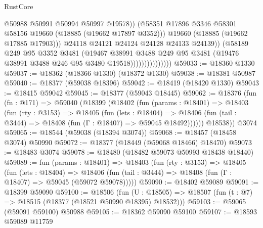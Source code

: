 \begin{lexlean}{RustCore}
\begin{coremodule}
                                      @50988
                                      @50991
                                      @50994
                                      @50997
                                      @19578))
                                  (@58351
                                    @17896
                                    @3346
                                    @58301
                                    @58156
                                    @19660
                                    (@18885 (@19662 @17897 @3352)))
                                  @19660
                                  (@18885 (@19662 @17885 @17903)))
                                @24118
                                @24121
                                @24124
                                @24128
                                @24133
                                @24139))
                            (@58189
                              @249
                              @95
                              @3352
                              @3481
                              (@19467
                                @38991
                                @3488
                                @249
                                @95
                                @3481
                                (@19476 @38991 @3488 @246 @95 @3480 @19518)))))))))))))))
@59033 := @18360 @1330
@59037 := @18362 (@18366 @1330) (@18372 @1330)
@59038 := @18381 @50987
@59040 := @18377 (@59038 @18396)
@59042 := @18419 (@18420 @1330)
@59043 := @18415 @59042
@59045 := @18377 (@59043 @18445)
@59062 := @18376
    (fun (fn : @171) =>
    @59040
      (@18399
        (@18402
          (fun (params : @18401) =>
          @18403
            (fun (rty : @3153) =>
            @18405
              (fun (lets : @18404) =>
              @18406 (fun (tail : @3444) => @18408 (fun (Γ : @18407) => @59045 @18492))))))
        @18538))
    @3074
@59065 := @18544 (@59038 (@18394 @3074))
@59068 := @18457 (@18458 @3074) @50990
@59072 := @18377 (@18449 (@59068 @18466) @18470)
@59073 := @18483 @3074
@59078 := @18480 (@18482 @59073 @50993 @18438 @18440)
@59089 := fun (params : @18401) =>
  @18403
    (fun (rty : @3153) =>
    @18405
      (fun (lets : @18404) =>
      @18406 (fun (tail : @3444) => @18408 (fun (Γ : @18407) => @59045 (@59072 @59078)))))
@59090 := @18402 @59089
@59091 := @18399 @59090
@59100 := @18506
    (fun (U : @18505) => @18507 (fun (t : @7) => @18515 (@18377 (@18521 @50990 @18395) @18532)))
@59103 := @59065 (@59091 @59100) @50988
@59105 := @18362 @59090 @59100
@59107 := @18593 @59089 @11759

\end{coremodule}
\end{lexlean}
